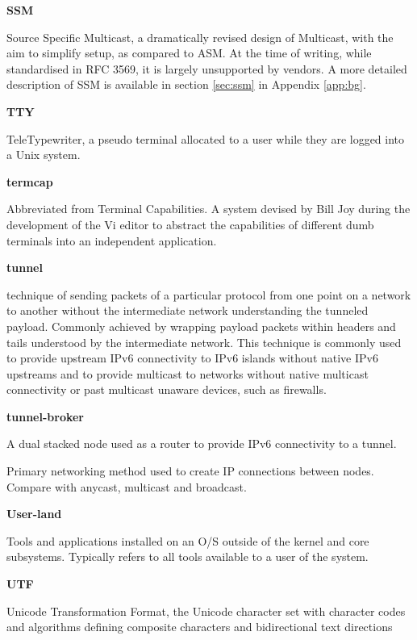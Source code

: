 \textbf{SSM}

Source Specific Multicast, a dramatically revised design of Multicast,
with the aim to simplify setup, as compared to ASM. At the time of
writing, while standardised in RFC 3569, it is largely unsupported by
vendors. A more detailed description of SSM is available in section 
\ref{sec:ssm} in Appendix \ref{app:bg}.

\textbf{TTY}

TeleTypewriter, a pseudo terminal allocated to a user while they are
logged into a Unix system.

\textbf{termcap}

Abbreviated from Terminal Capabilities. A system devised by Bill Joy
during the development of the Vi editor to abstract the capabilities of
different dumb terminals into an independent application.

\textbf{tunnel}

technique of sending packets of a particular protocol from one point on
a network to another without the intermediate network understanding the
tunneled payload. Commonly achieved by wrapping payload packets within
headers and tails understood by the intermediate network. This
technique is commonly used to provide upstream IPv6 connectivity to IPv6
islands without native IPv6 upstreams and to provide multicast
to networks without native multicast connectivity or past multicast
unaware devices, such as firewalls.

\textbf{tunnel-broker}

A dual stacked node used as a router to provide IPv6 connectivity to a
tunnel.


Primary networking method used to create IP connections between nodes.
Compare with anycast, multicast and broadcast.

\textbf{User-land}

Tools and applications installed on an O/S outside of the kernel and
core subsystems. Typically refers to all tools available to a user of
the system.


\textbf{UTF}

Unicode Transformation Format, the Unicode character set with character 
codes and algorithms defining composite characters and bidirectional
text directions

